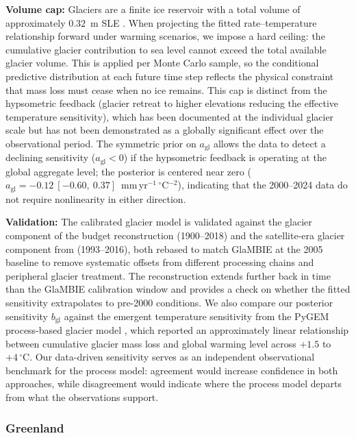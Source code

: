\documentclass[11pt]{article}
\begin{document}
\textbf{Volume cap:} Glaciers are a finite ice reservoir with a total volume of approximately $0.32$~m SLE \citep{Farinotti2019}. When projecting the fitted rate--temperature relationship forward under warming scenarios, we impose a hard ceiling: the cumulative glacier contribution to sea level cannot exceed the total available glacier volume. This is applied per Monte Carlo sample, so the conditional predictive distribution at each future time step reflects the physical constraint that mass loss must cease when no ice remains. This cap is distinct from the hypsometric feedback (glacier retreat to higher elevations reducing the effective temperature sensitivity), which has been documented at the individual glacier scale \citep{Marzeion2014} but has not been demonstrated as a globally significant effect over the observational period. The symmetric prior on $a_{\mathrm{gl}}$ allows the data to detect a declining sensitivity ($a_{\mathrm{gl}} < 0$) if the hypsometric feedback is operating at the global aggregate level; the posterior is centered near zero ($a_{\mathrm{gl}} = -0.12\ [-0.60,\ 0.37]$~mm\,yr$^{-1}$\,$^\circ$C$^{-2}$), indicating that the 2000--2024 data do not require nonlinearity in either direction.

\textbf{Validation:} The calibrated glacier model is validated against the glacier component of the \citet{Frederikse2020} budget reconstruction (1900--2018) and the satellite-era glacier component from \citet{Horwath2022} (1993--2016), both rebased to match GlaMBIE at the 2005 baseline to remove systematic offsets from different processing chains and peripheral glacier treatment. The \citet{Frederikse2020} reconstruction extends further back in time than the GlaMBIE calibration window and provides a check on whether the fitted sensitivity extrapolates to pre-2000 conditions. We also compare our posterior sensitivity $b_{\mathrm{gl}}$ against the emergent temperature sensitivity from the PyGEM process-based glacier model \citep{Rounce2023}, which reported an approximately linear relationship between cumulative glacier mass loss and global warming level across $+1.5$ to $+4\,^\circ$C. Our data-driven sensitivity serves as an independent observational benchmark for the process model: agreement would increase confidence in both approaches, while disagreement would indicate where the process model departs from what the observations support.

	\subsubsection{Greenland}
	\label{sec:greenland}
\end{document}

